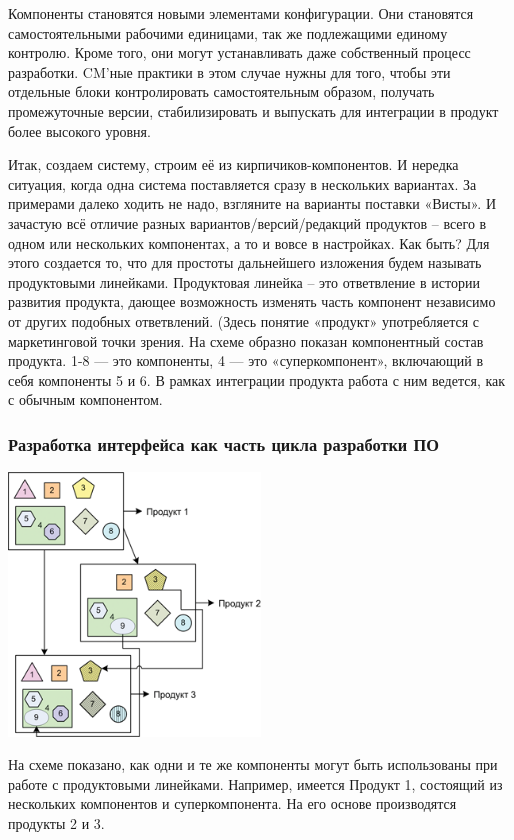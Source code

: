 \documentclass{../industrial-development}
\begin{document}
Компоненты становятся новыми элементами конфигурации. Они становятся самостоятельными рабочими единицами, так же подлежащими единому контролю. Кроме того, они могут устанавливать даже собственный процесс разработки. CM’ные практики в этом случае нужны для того, чтобы эти отдельные блоки контролировать самостоятельным образом, получать промежуточные версии, стабилизировать и выпускать для интеграции в продукт более высокого уровня.

Итак, создаем систему, строим её из кирпичиков-компонентов. И нередка ситуация, когда одна система поставляется сразу в нескольких вариантах. За примерами далеко ходить не надо, взгляните на варианты поставки «Висты». И зачастую всё отличие разных вариантов/версий/редакций продуктов – всего в одном или нескольких компонентах, а то и вовсе в настройках. Как быть? Для этого создается то, что для простоты дальнейшего изложения будем называть продуктовыми линейками. Продуктовая линейка – это ответвление в истории развития продукта, дающее возможность изменять часть компонент независимо от других подобных ответвлений. (Здесь понятие «продукт» употребляется с маркетинговой точки зрения.
На схеме образно показан компонентный состав продукта. 1-8 — это компоненты, 4 — это «суперкомпонент», включающий в себя компоненты 5 и 6. В рамках интеграции продукта работа с ним ведется, как с обычным компонентом.
~\cite{Configurations}

\begin{frame} \frametitle{Разработка интерфейса как часть цикла разработки ПО}
 \includegraphics[width=\textwidth, height=7cm]{product}

\end{frame}

\lecturenotes

На схеме показано, как одни и те же компоненты могут быть использованы при работе с продуктовыми линейками. Например, имеется Продукт 1, состоящий из нескольких компонентов и суперкомпонента. На его основе производятся продукты 2 и 3.
\end{document}
